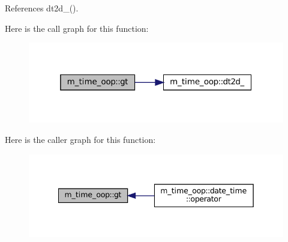 References dt2d\+\_\+().

Here is the call graph for this function\+:\nopagebreak
\begin{figure}[H]
\begin{center}
\leavevmode
\includegraphics[width=319pt]{namespacem__time__oop_a753692f18b6cd100401603d0b88d7c3c_cgraph}
\end{center}
\end{figure}
Here is the caller graph for this function\+:\nopagebreak
\begin{figure}[H]
\begin{center}
\leavevmode
\includegraphics[width=342pt]{namespacem__time__oop_a753692f18b6cd100401603d0b88d7c3c_icgraph}
\end{center}
\end{figure}
\mbox{\label{namespacem__time__oop_ac81ff1eb27f637a60530d3c5d442fc71}} 

